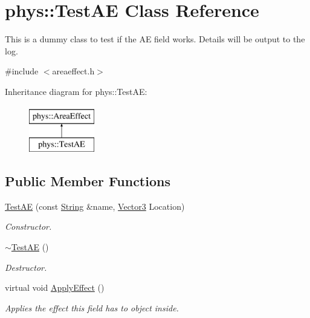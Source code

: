 \hypertarget{classphys_1_1TestAE}{
\section{phys::TestAE Class Reference}
\label{d1/dca/classphys_1_1TestAE}
}


This is a dummy class to test if the AE field works. Details will be output to the log.  




{\ttfamily \#include $<$areaeffect.h$>$}

Inheritance diagram for phys::TestAE:\begin{figure}[H]
\begin{center}
\leavevmode
\includegraphics[height=2cm]{d1/dca/classphys_1_1TestAE}
\end{center}
\end{figure}
\subsection*{Public Member Functions}
\begin{DoxyCompactItemize}
\item 
\hyperlink{classphys_1_1TestAE_a851bf73722a9b3a3886e1dbf4600861c}{TestAE} (const \hyperlink{namespacephys_aa03900411993de7fbfec4789bc1d392e}{String} \&name, \hyperlink{classphys_1_1Vector3}{Vector3} Location)
\begin{DoxyCompactList}\small\item\em Constructor. \item\end{DoxyCompactList}\item 
\hyperlink{classphys_1_1TestAE_aa3ceb77df713b5cafa97495de61e4b0a}{$\sim$TestAE} ()
\begin{DoxyCompactList}\small\item\em Destructor. \item\end{DoxyCompactList}\item 
virtual void \hyperlink{classphys_1_1TestAE_a191c60dbfa277e850ea392d9ab774c42}{ApplyEffect} ()
\begin{DoxyCompactList}\small\item\em Applies the effect this field has to object inside. \item\end{DoxyCompactList}\end{DoxyCompactItemize}


